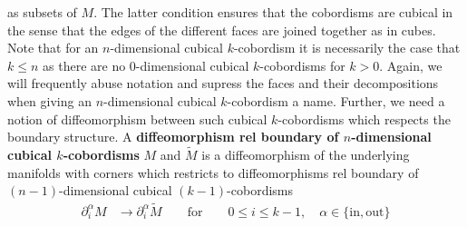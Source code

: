 as subsets of $M$. The latter condition ensures that the cobordisms are {\glqq}cubical{\grqq} in the sense that the edges of the different faces are joined together as in cubes. Note that for an $n$-dimensional cubical $k$-cobordism it is necessarily the case that $k \leq n$ as there are no $0$-dimensional cubical $k$-cobordisms for $k > 0$. Again, we will frequently abuse notation and supress the faces and their decompositions when giving an $n$-dimensional cubical $k$-cobordism a name. Further, we need a notion of diffeomorphism between such cubical $k$-cobordisms which respects the boundary structure. A \textbf{diffeomorphism rel boundary of $n$-dimensional cubical $k$-cobordisms} $M$ and $\tilde{M}$ is a diffeomorphism of the underlying manifolds with corners which restricts to diffeomorphisms rel boundary of $(n-1)$-dimensional cubical $(k-1)$-cobordisms
\begin{align*}
  \partial_{i}^{\alpha}
  M
  &\to
  \partial_{i}^{\alpha}
  \tilde{M}
  \qquad
  \text{for}
  \qquad
  0
  \leq
  i
  \leq
  k-1
  ,\quad
  \alpha
  \in
  \lbrace
    \mathrm{in}
    ,
    \mathrm{out}
  \rbrace
\end{align*}
\\
